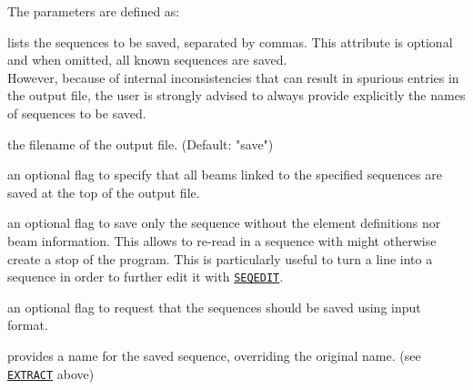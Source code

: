 The parameters are defined as: 
\begin{5.02.06}
\begin{madlist}
	 lists the sequences to be saved, separated by commas. 
	This attribute is optional and when omitted, all known 
	sequences are saved. \\
	However, because of internal inconsistencies that can result in spurious 
	entries in the output file, the user is strongly advised to always provide 
	explicitly the names of sequences to be saved.
	
	 the filename of the output file. (Default: "save")
	
	 an optional flag to specify that all beams linked to the
	specified sequences are saved at the top of the output file.
	
	 an optional flag to save only the sequence without the
	element definitions nor beam information. This allows to re-read in a
	sequence with might otherwise create a stop of the program. This is
	particularly useful to turn a line into a sequence in order to further edit 
	it with \hyperref[sec:seqedit]{\tt SEQEDIT}.
	
	 an optional flag to request that the sequences should be  
	saved using \madeight input format.  
	
	 provides a name for the saved sequence, overriding the 
	original name. (see \hyperref[sec:extract]{\tt EXTRACT} above)
\end{madlist}
\end{5.02.06}


